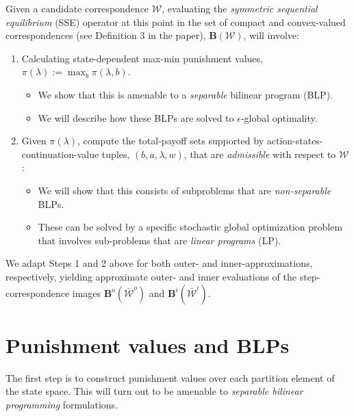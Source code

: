 \documentclass[a4paper,10pt,english]{sphinxmanual}
\begin{document}
Given a candidate correspondence $\mathcal{W}$, evaluating the \emph{symmetric sequential equilibrium} (SSE) operator at this point in the set of compact and convex-valued correspondences (see Definition 3 in the paper), $\mathbf{B}(\mathcal{W})$, will involve:
\begin{enumerate}
\item {} 
Calculating state-dependent max-min punishment values,
$\pi(\lambda) := \max_{b} \pi(\lambda,b)$.
\begin{itemize}
\item {} 
We show that this is amenable to a \emph{separable} bilinear program (BLP).

\item {} 
We will describe how these BLPs are solved to $\epsilon$-global optimality.

\end{itemize}

\item {} 
Given $\pi (\lambda)$, compute the total-payoff sets supported by action-states-continuation-value tuples, $(b,a,\lambda,w)$, that are \emph{admissible} with respect to $\mathcal{W}$:
\begin{itemize}
\item {} 
We will show that this consists of subproblems that are \emph{non-separable}
BLPs.

\item {} 
These can be solved by a specific stochastic global optimization problem
that involves sub-problems that are \emph{linear programs} (LP).

\end{itemize}

\end{enumerate}

We adapt Steps 1 and 2 above for both outer- and inner-approximations, respectively, yielding  approximate outer- and inner evaluations of the step-correspondence images
$\mathbf{B}^{o}(\bar{\mathcal{W}}^{o})$ and $\mathbf{B}^{i}(\bar{\mathcal{W}}^{i})$.


\chapter{Punishment values and BLPs}
\label{payoff_bilinear_punish:punishment-values-and-blps}\label{payoff_bilinear_punish::doc}
The first step is to construct punishment values over each partition element
of the state space. This will turn out to be amenable to \emph{separable bilinear
programming} formulations.
\end{document}
